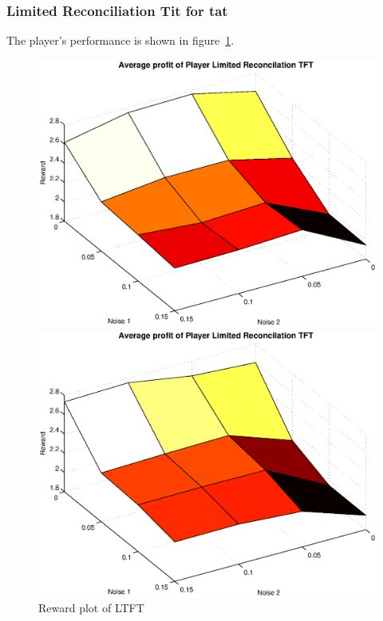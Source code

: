 \subsubsection{Limited Reconciliation Tit for tat}
The player's performance is shown in figure~\ref{pic player lrtft}.\\
\begin{figure}[h]
	\caption{Reward plot of LTFT}
	\label{pic player lrtft}
\begin{minipage}[hbt]{0.65\textwidth}
	\centering
	\includegraphics[width=\textwidth]{pics/simulation1/Reward_vs_Noise_of_Player_Limited_Reconcilation_TFT}
\end{minipage}
\hfill
\begin{minipage}[hbt]{0.3\textwidth}
	\centering
	\includegraphics[width=\textwidth]{pics/simulation2/Reward_vs_Noise_of_Player_Limited_Reconcilation_TFT}
\end{minipage}

\end{figure}


